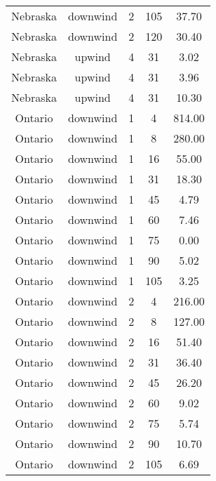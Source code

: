 \documentclass{article}
\begin{document}
\begin{longtable}[H]{ccccc}
Nebraska  & downwind  & 2        & 105          & 37.70                   \\
Nebraska  & downwind  & 2        & 120          & 30.40                   \\
Nebraska  & upwind    & 4        & 31           & 3.02                    \\
Nebraska  & upwind    & 4        & 31           & 3.96                    \\
Nebraska  & upwind    & 4        & 31           & 10.30                   \\
Ontario   & downwind  & 1        & 4            & 814.00                  \\
Ontario   & downwind  & 1        & 8            & 280.00                  \\
Ontario   & downwind  & 1        & 16           & 55.00                   \\
Ontario   & downwind  & 1        & 31           & 18.30                   \\
Ontario   & downwind  & 1        & 45           & 4.79                    \\
Ontario   & downwind  & 1        & 60           & 7.46                    \\
Ontario   & downwind  & 1        & 75           & 0.00                    \\
Ontario   & downwind  & 1        & 90           & 5.02                    \\
Ontario   & downwind  & 1        & 105          & 3.25                    \\
Ontario   & downwind  & 2        & 4            & 216.00                  \\
Ontario   & downwind  & 2        & 8            & 127.00                  \\
Ontario   & downwind  & 2        & 16           & 51.40                   \\
Ontario   & downwind  & 2        & 31           & 36.40                   \\
Ontario   & downwind  & 2        & 45           & 26.20                   \\
Ontario   & downwind  & 2        & 60           & 9.02                    \\
Ontario   & downwind  & 2        & 75           & 5.74                    \\
Ontario   & downwind  & 2        & 90           & 10.70                   \\
Ontario   & downwind  & 2        & 105          & 6.69                    \\

\end{longtable}
\end{document}
